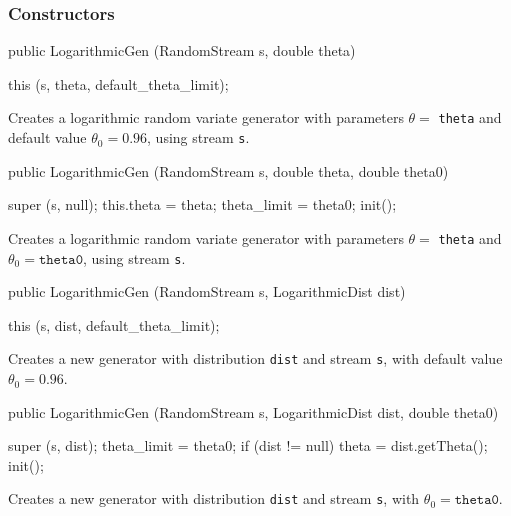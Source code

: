 \subsubsection* {Constructors}
\begin{code}

   public LogarithmicGen (RandomStream s, double theta)\begin{hide} {
      this (s, theta, default_theta_limit);
   }\end{hide}
\end{code}
\begin{tabb} Creates a logarithmic random variate generator with parameters
  $\theta = $ \texttt{theta} and default value $\theta_0 = 0.96$,
  using stream \texttt{s}.
\end{tabb}
\begin{code}

   public LogarithmicGen (RandomStream s, double theta, double theta0)\begin{hide} {
      super (s, null);
      this.theta = theta;
      theta_limit = theta0;
      init();
   }\end{hide}
\end{code}
\begin{tabb} Creates a logarithmic random variate generator with parameters
  $\theta = $ \texttt{theta} and $\theta_0 = \texttt{theta0}$,
  using stream \texttt{s}.
\end{tabb}
\begin{code}

   public LogarithmicGen (RandomStream s, LogarithmicDist dist)\begin{hide} {
      this (s, dist, default_theta_limit);
   }\end{hide}
\end{code}
\begin{tabb} Creates a new generator with distribution \texttt{dist} and
  stream \texttt{s}, with default value $\theta_0 = 0.96$.
\end{tabb}
\begin{code}

   public LogarithmicGen (RandomStream s, LogarithmicDist dist,
                          double theta0)\begin{hide} {
      super (s, dist);
      theta_limit = theta0;
      if (dist != null)
         theta = dist.getTheta();
      init();
   }\end{hide}
\end{code}
\begin{tabb} Creates a new generator with distribution \texttt{dist}
   and stream \texttt{s}, with $\theta_0 = \texttt{theta0}$.
\end{tabb}


